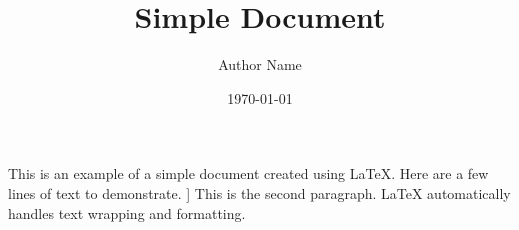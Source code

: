 \documentclass{article}
\begin{document}
\title{Simple Document}
\author{Author Name}
\date{\today}

\maketitle

This is an example of a simple document created using LaTeX. Here are a few lines of text to demonstrate.
]
This is the second paragraph. LaTeX automatically handles text wrapping and formatting.
\end{document}
